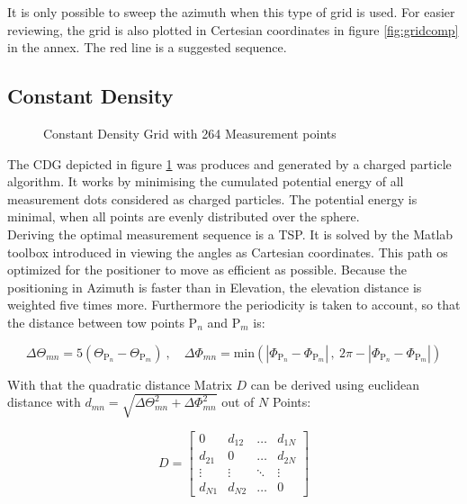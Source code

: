 It is only possible to sweep the azimuth when this type of grid is used. For easier reviewing, the grid is also plotted in Certesian coordinates in figure \ref{fig:gridcomp} in the annex. The red line is a suggested sequence.

\subsection{Constant Density}

\begin{figure}[h]
  \centering
  \centering
\caption{Constant Density Grid with 264 Measurement points}
\label{fig:cdg}
\end{figure}

The \ac{CDG} depicted in figure \ref{fig:cdg} was produces and generated by a charged particle algorithm. It works by minimising the cumulated potential energy of all measurement dots considered as charged particles. The potential energy is minimal, when all points are evenly distributed over the sphere.\\ 
Deriving the optimal measurement sequence is a \ac{TSP}. It is solved by the Matlab toolbox introduced in \cite{tsp} viewing the angles as Cartesian coordinates. This path os optimized for the positioner to move as efficient as possible. Because the positioning in Azimuth is faster than in Elevation, the elevation distance is weighted five times more. Furthermore the periodicity is taken to account, so that the distance between tow points $\text{P}_n$ and $\text{P}_m$ is:

\begin{equation}
\Delta\Theta_{mn} = 5\left(\Theta_{\text{P}_n}-\Theta_{\text{P}_m}\right)\ ,\quad \Delta\Phi_{mn} = \text{min}\left(|\Phi_{\text{P}_n}-\Phi_{\text{P}_m}|\, ,\ 2\pi-|\Phi_{\text{P}_n}-\Phi_{\text{P}_m}|\right)
\end{equation}

With that the quadratic distance Matrix $D$ can be derived using euclidean distance with $d_{mn} = \sqrt{\Delta\Theta_{mn}^2+\Delta\Phi_{mn}^2}$ out of $N$ Points:

\begin{equation}
D = \begin{bmatrix}
 0 & d_{12} & \dots & d_{1N}\\
 d_{21} & 0 & \dots & d_{2N}\\
 \vdots & \vdots & \ddots & \vdots\\
 d_{N1} & d_{N2} & \dots & 0
\end{bmatrix}
\end{equation}

